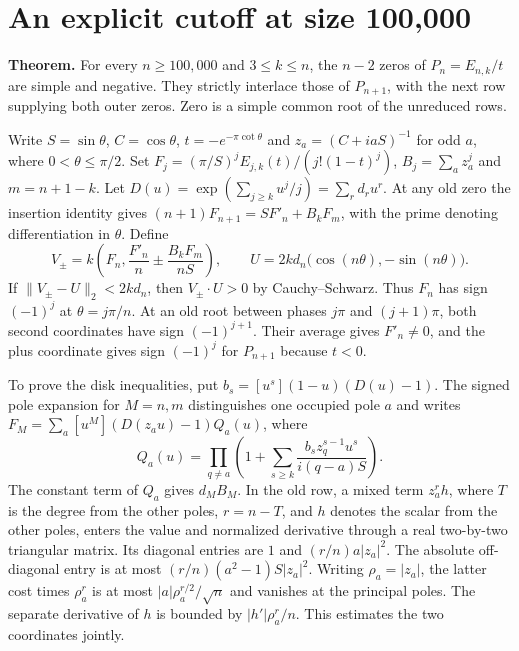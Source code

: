 \section{An explicit cutoff at size 100,000}
\label{sec:degree-block-cutoff}

\textbf{Theorem.} For every \(n\ge100{,}000\) and \(3\le k\le n\), the
\(n-2\) zeros of \(P_n=E_{n,k}/t\) are simple and negative. They strictly
interlace those of \(P_{n+1}\), with the next row supplying both outer
zeros. Zero is a simple common root of the unreduced rows.

Write \(S=\sin\theta\), \(C=\cos\theta\), \(t=-e^{-\pi\cot\theta}\) and
\(z_a=(C+iaS)^{-1}\) for odd \(a\), where \(0<\theta\le\pi/2\).
Set \(F_j=(\pi/S)^j E_{j,k}(t)/(j!(1-t)^j)\), \(B_j=\sum_a z_a^j\)
and \(m=n+1-k\). Let \(D(u)=\exp(\sum_{j\ge k}u^j/j)=\sum_r d_r u^r\).
At any old zero the insertion identity gives
\((n+1)F_{n+1}=SF'_n+B_kF_m\), with the prime denoting differentiation
in \(\theta\). Define
\[
 V_\pm=k\left(F_n,\frac{F'_n}{n}\pm\frac{B_kF_m}{nS}\right),
 \qquad U=2kd_n\bigl(\cos(n\theta),-\sin(n\theta)\bigr).
\]
If \(\|V_\pm-U\|_2<2kd_n\), then \(V_\pm\cdot U>0\) by Cauchy--Schwarz.
Thus \(F_n\) has sign \((-1)^j\) at \(\theta=j\pi/n\). At an old root
between phases \(j\pi\) and \((j+1)\pi\), both second coordinates have
sign \((-1)^{j+1}\). Their average gives \(F'_n\ne0\), and the plus
coordinate gives sign \((-1)^j\) for \(P_{n+1}\) because \(t<0\).

To prove the disk inequalities, put \(b_s=[u^s](1-u)(D(u)-1)\). The signed
pole expansion for \(M=n,m\) distinguishes one occupied pole \(a\)
and writes \(F_M=\sum_a[u^M](D(z_a u)-1)Q_a(u)\), where
\[
 Q_a(u)=\prod_{q\ne a}\left(1+\sum_{s\ge k}
     \frac{b_s z_q^{s-1}u^s}{i(q-a)S}\right).
\]
The constant term of \(Q_a\) gives \(d_M B_M\). In the old row, a mixed
term \(z_a^r h\), where \(T\) is the degree from the other poles, \(r=n-T\), and
\(h\) denotes the scalar from the other poles, enters the value and
normalized derivative through a real two-by-two triangular matrix.
Its diagonal entries are \(1\) and \((r/n)a|z_a|^2\). The absolute
off-diagonal entry is at most \((r/n)(a^2-1)S|z_a|^2\).
Writing \(\rho_a=|z_a|\), the latter cost times \(\rho_a^r\) is at
most \(|a|\rho_a^{r/2}/\sqrt n\) and vanishes at the principal poles.
The separate derivative of \(h\) is bounded by \(|h'|\rho_a^r/n\).
This estimates the two coordinates jointly.

